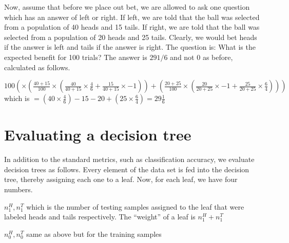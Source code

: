 Now, assume that before we place out bet, we are allowed to ask one question
which has an answer of left or right. If left, we are told that the ball was
selected from a population of 40 heads and 15 tails. If right, we are told that
the ball was selected from a population of 20 heads and 25 tails. Clearly, we
would bet heads if the answer is left and tails if the answer is right. The
question is: What is the expected benefit for 100 trials? 
The answer is \(29 1/6\) and not 0 as before, calculated as follows.

\(100 ( \times ( \frac{40+15}{100} \times ( 
  \frac{40}{40+15} \times \frac{4}{6}  + 
  \frac{15}{40+15} \times -1 ) ) + 
  ( \frac{20+25}{100} \times ( 
  \frac{20}{20+25} \times -1 + 
  \frac{25}{20+25} \times \frac{6}{4}  ) ) )
  \)
which is \(
 = (40 \times  \frac{4}{6}) -15 - 20 + (25 \times \frac{6}{4} )
 = 29 \frac{1}{6}\)


\newpage
\section{Evaluating a decision tree}
In addition to the standard metrics, such as classification accuracy, we
evaluate decision trees as follows. Every element of the data set is 
fed into the decision tree, thereby
assigning each one to a leaf. Now, for each leaf, we have four numbers.
\be
\item \(n^H_1, n^T_1\) which is the number of testing samples assigned 
to the leaf that were labeled heads and tails respectively. The ``weight'' of a
leaf is \(n^H_1 + n^T_1\)
\item \(n^H_0, n^T_0\) same as above but for the training samples
\ee

